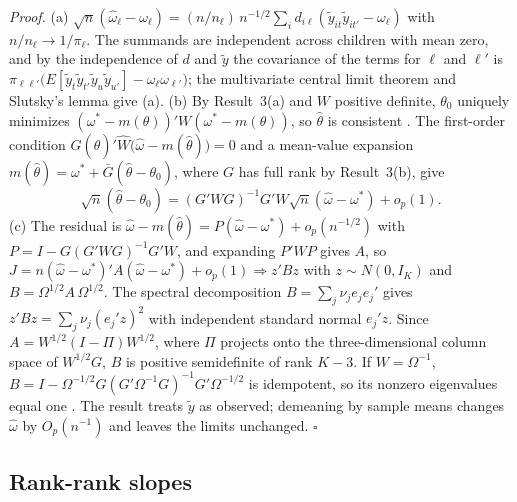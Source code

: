 \documentclass[11pt]{article}
\begin{document}
\proofskip
\noindent\emph{Proof.} (a) $\sqrt{n}(\hat\omega_\ell - \omega_\ell) = (n/n_\ell)\,n^{-1/2}\sum_i d_{i\ell}(\tilde y_{it}\tilde y_{it'} - \omega_\ell)$ with $n/n_\ell \to 1/\pi_\ell$. The summands are independent across children with mean zero, and by the independence of $d$ and $\tilde y$ the covariance of the terms for $\ell$ and $\ell'$ is $\pi_{\ell\ell'}\big(E[\tilde y_t\tilde y_{t'}\tilde y_u\tilde y_{u'}] - \omega_\ell\omega_{\ell'}\big)$; the multivariate central limit theorem and Slutsky's lemma give (a).
\partskip
(b) By Result~3(a) and $W$ positive definite, $\theta_0$ uniquely minimizes $(\omega^* - m(\theta))'W(\omega^* - m(\theta))$, so $\hat\theta$ is consistent \citep[Theorem~2.1]{NeweyMcFadden1994}. The first-order condition $G(\hat\theta)'\hat W\big(\hat\omega - m(\hat\theta)\big) = 0$ and a mean-value expansion $m(\hat\theta) = \omega^* + \bar G(\hat\theta - \theta_0)$, where $G$ has full rank by Result~3(b), give
\[
\sqrt{n}(\hat\theta - \theta_0) = (G'WG)^{-1}G'W\sqrt{n}(\hat\omega - \omega^*) + o_p(1).
\]
\partskip
(c) The residual is $\hat\omega - m(\hat\theta) = P(\hat\omega - \omega^*) + o_p(n^{-1/2})$ with $P = I - G(G'WG)^{-1}G'W$, and expanding $P'WP$ gives $A$, so $J = n(\hat\omega - \omega^*)'A(\hat\omega - \omega^*) + o_p(1) \Rightarrow z'Bz$ with $z \sim N(0, I_K)$ and $B = \Omega^{1/2}A\,\Omega^{1/2}$. The spectral decomposition $B = \sum_j \nu_j e_je_j'$ gives $z'Bz = \sum_j \nu_j(e_j'z)^2$ with independent standard normal $e_j'z$. Since $A = W^{1/2}(I - \Pi)W^{1/2}$, where $\Pi$ projects onto the three-dimensional column space of $W^{1/2}G$, $B$ is positive semidefinite of rank $K - 3$. If $W = \Omega^{-1}$, $B = I - \Omega^{-1/2}G(G'\Omega^{-1}G)^{-1}G'\Omega^{-1/2}$ is idempotent, so its nonzero eigenvalues equal one \citep{Hansen1982}. The result treats $\tilde y$ as observed; demeaning by sample means changes $\hat\omega$ by $O_p(n^{-1})$ and leaves the limits unchanged. \hfill$\square$

\subsection{Rank-rank slopes}
\label{app:rank}
\end{document}

